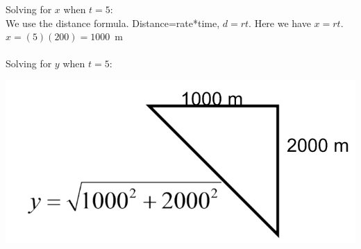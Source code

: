 \documentclass[nooutcomes,handout]{ximera}
\begin{document}
\begin{problem}
\begin{freeResponse}
Solving for $x$ when $t=5$:\\
We use the distance formula.  Distance=rate*time, $d=rt$.  Here we have $x=rt$.  $x=(5)(200)=1000$\ m  \\\\

Solving for $y$ when $t=5$:
	\begin{image}
	\includegraphics[scale=.5]{Figure3.png}
	\end{image}

\end{freeResponse}
\end{problem}
\end{document}
